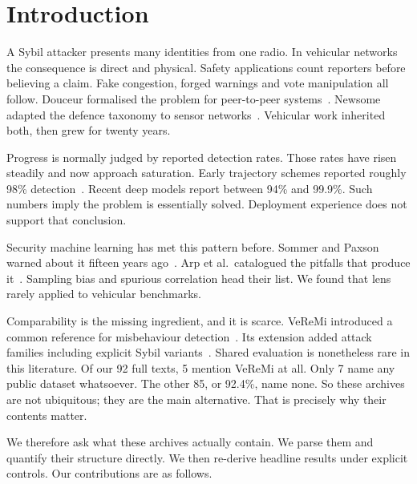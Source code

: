 \documentclass[journal,twoside]{IEEEtran}
\begin{document}
\section{Introduction}

A Sybil attacker presents many identities from one radio.
In vehicular networks the consequence is direct and physical.
Safety applications count reporters before believing a claim.
Fake congestion, forged warnings and vote manipulation all follow.
Douceur formalised the problem for peer-to-peer systems~\cite{douceur2002}.
Newsome adapted the defence taxonomy to sensor networks~\cite{newsome2004}.
Vehicular work inherited both, then grew for twenty years.

Progress is normally judged by reported detection rates.
Those rates have risen steadily and now approach saturation.
Early trajectory schemes reported roughly 98\% detection~\cite{chang2011}.
Recent deep models report between 94\% and 99.9\%.
Such numbers imply the problem is essentially solved.
Deployment experience does not support that conclusion.

Security machine learning has met this pattern before.
Sommer and Paxson warned about it fifteen years ago~\cite{sommer2010}.
Arp et al.\ catalogued the pitfalls that produce it~\cite{arp2022}.
Sampling bias and spurious correlation head their list.
We found that lens rarely applied to vehicular benchmarks.

Comparability is the missing ingredient, and it is scarce.
VeReMi introduced a common reference for misbehaviour detection~\cite{heijden2018}.
Its extension added attack families including explicit Sybil variants~\cite{kamel2020}.
Shared evaluation is nonetheless rare in this literature.
Of our 92 full texts, 5 mention VeReMi at all.
Only 7 name any public dataset whatsoever.
The other 85, or 92.4\%, name none.
So these archives are not ubiquitous; they are the main alternative.
That is precisely why their contents matter.

We therefore ask what these archives actually contain.
We parse them and quantify their structure directly.
We then re-derive headline results under explicit controls.
Our contributions are as follows.
\end{document}
